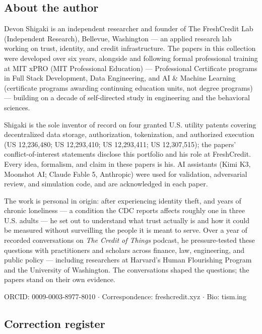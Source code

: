 \documentclass[
]{article}
\begin{document}
\subsection{About the author}\label{about-the-author}

Devon Shigaki is an independent researcher and founder of The
FreshCredit Lab (Independent Research), Bellevue, Washington --- an
applied research lab working on trust, identity, and credit
infrastructure. The papers in this collection were developed over six
years, alongside and following formal professional training at MIT xPRO
(MIT Professional Education) --- Professional Certificate programs in
Full Stack Development, Data Engineering, and AI \& Machine Learning
(certificate programs awarding continuing education units, not degree
programs) --- building on a decade of self-directed study in engineering
and the behavioral sciences.

Shigaki is the sole inventor of record on four granted U.S. utility
patents covering decentralized data storage, authorization,
tokenization, and authorized execution (US 12,236,480; US 12,293,410; US
12,293,411; US 12,307,515); the papers' conflict-of-interest statements
disclose this portfolio and his role at FreshCredit. Every idea,
formalism, and claim in these papers is his. AI assistants (Kimi K3,
Moonshot AI; Claude Fable 5, Anthropic) were used for validation,
adversarial review, and simulation code, and are acknowledged in each
paper.

The work is personal in origin: after experiencing identity theft, and
years of chronic loneliness --- a condition the CDC reports affects
roughly one in three U.S. adults --- he set out to understand what trust
actually is and how it could be measured without surveilling the people
it is meant to serve. Over a year of recorded conversations on \emph{The
Credit of Things} podcast, he pressure-tested these questions with
practitioners and scholars across finance, law, engineering, and public
policy --- including researchers at Harvard's Human Flourishing Program
and the University of Washington. The conversations shaped the
questions; the papers stand on their own evidence.

ORCID: 0009-0003-8977-8010 \(\cdot\) Correspondence: freshcredit.xyz
\(\cdot\) Bio: tism.ing

\subsection{Correction register}\label{correction-register}
\end{document}
